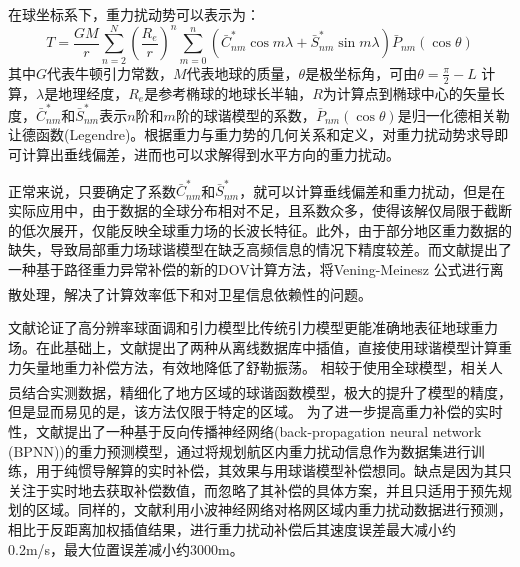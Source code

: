 \documentclass[12pt,a4,utf8]{article}
\newcommand{\upcite}[1]{\textsuperscript{\textsuperscript{\cite{#1}}}} %
\begin{document}
在球坐标系下，重力扰动势可以表示为：
\begin{equation}
      T = \frac{GM}{r}\sum_{n=2}^{N}{\left( \frac{R_e}{r}\right)^n\sum_{m=0}^{n}(\bar{C}_{nm}^{\ast}\cos{m\lambda} + \bar{S}_{nm}^{\ast}\sin{m\lambda})\bar{P}_{nm}(\cos \theta)} 
\end{equation}
其中$G$代表牛顿引力常数，$M$代表地球的质量，$\theta$是极坐标角，可由$\theta = \frac{\pi}{2} - L$ 计算，$\lambda$是地理经度，$R_e$是参考椭球的地球长半轴，$R$为计算点到椭球中心的矢量长度，$\bar{C}_{nm}^{\ast}$和$\bar{S}_{nm}^{\ast}$表示$n$阶和$m$阶的球谐模型的系数，$\bar{P}_{nm}(\cos \theta)$是归一化德相关勒让德函数(Legendre)。根据重力与重力势的几何关系和定义，对重力扰动势求导即可计算出垂线偏差，进而也可以求解得到水平方向的重力扰动。

正常来说，只要确定了系数$\bar{C}_{nm}^{\ast}$和$\bar{S}_{nm}^{\ast}$，就可以计算垂线偏差和重力扰动，但是在实际应用中，由于数据的全球分布相对不足，且系数众多，使得该解仅局限于截断的低次展开，仅能反映全球重力场的长波长特征。此外，由于部分地区重力数据的缺失，导致局部重力场球谐模型在缺乏高频信息的情况下精度较差。而文献\cite{hao2022analysis}提出了一种基于路径重力异常补偿的新的DOV计算方法，将Vening-Meinesz 公式进行离散处理\upcite{ning1994spherical,chen1982methods,ning2006refined}，解决了计算效率低下和对卫星信息依赖性的问题。

文献\cite{wang2016application}论证了高分辨率球面调和引力模型比传统引力模型更能准确地表征地球重力场。在此基础上，文献\cite{wu2016gravity}提出了两种从离线数据库中插值，直接使用球谐模型计算重力矢量地重力补偿方法，有效地降低了舒勒振荡。
相较于使用全球模型，相关人员结合实测数据，精细化了地方区域的球谐函数模型\upcite{zhu2019research,weng2020analysis}，极大的提升了模型的精度，但是显而易见的是，该方法仅限于特定的区域。
为了进一步提高重力补偿的实时性，文献\cite{gao2021real}提出了一种基于反向传播神经网络(back-propagation neural network (BPNN))的重力预测模型，通过将规划航区内重力扰动信息作为数据集进行训练，用于纯惯导解算的实时补偿，其效果与用球谐模型补偿想同。缺点是因为其只关注于实时地去获取补偿数值，而忽略了其补偿的具体方案，并且只适用于预先规划的区域。同样的，文献\cite{ZHOUXIAO2016}利用小波神经网络对格网区域内重力扰动数据进行预测，相比于反距离加权插值结果，进行重力扰动补偿后其速度误差最大减小约0.2m/s，最大位置误差减小约3000m。
\end{document}

